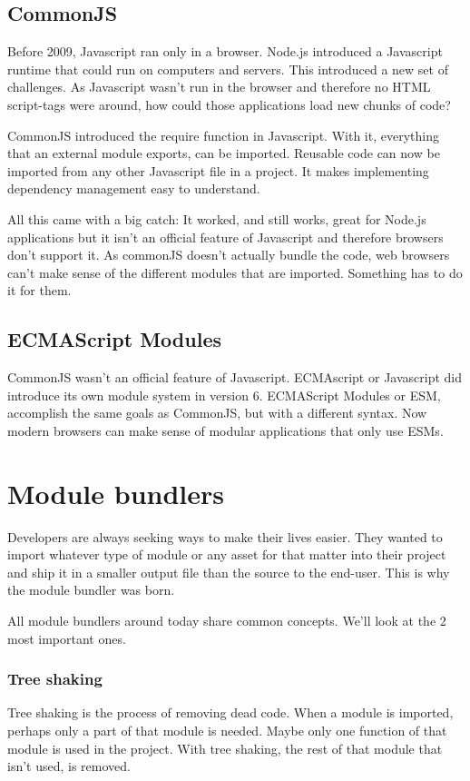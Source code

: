 \subsection{CommonJS}

Before 2009, Javascript ran only in a browser. Node.js introduced a Javascript runtime that could run on computers and servers. This introduced a new set of challenges. As Javascript wasn’t run in the browser and therefore no HTML script-tags were around, how could those applications load new chunks of code? 

CommonJS introduced the require function in Javascript. With it, everything that an external module exports, can be imported. Reusable code can now be imported from any other Javascript file in a project. It makes implementing dependency management easy to understand.

All this came with a big catch: It worked, and still works, great for Node.js applications but it isn’t an official feature of Javascript and therefore browsers don’t support it. As commonJS doesn’t actually bundle the code, web browsers can’t make sense of the different modules that are imported. Something has to do it for them. 

\subsection{ECMAScript Modules}

CommonJS wasn’t an official feature of Javascript. ECMAscript or Javascript did introduce its own module system in version 6. ECMAScript Modules or ESM, accomplish the same goals as CommonJS, but with a different syntax. Now modern browsers can make sense of modular applications that only use ESMs. 

\section{Module bundlers}

Developers are always seeking ways to make their lives easier. They wanted to import whatever type of module or any asset for that matter into their project and ship it in a smaller output file than the source to the end-user. This is why the module bundler was born. 

All module bundlers around today share common concepts. We’ll look at the 2 most important ones. 
\subsubsection{Tree shaking}
Tree shaking is the process of removing dead code. When a module is imported, perhaps only a part of that module is needed. Maybe only one function of that module is used in the project. With tree shaking, the rest of that module that isn’t used, is removed. 
